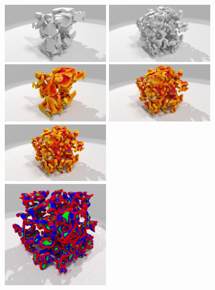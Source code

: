 \begin{figure}[ht]{
    \begin{center}
    \includegraphics[trim={17cm 0 13cm 0},clip,width=4.5cm]{images/digitalSnow/SnowE2_DigitalData}
    \includegraphics[trim={17cm 0 13cm 0},clip,width=4.5cm]{images/digitalSnow/SnowI08_DigitalData}\\
    \includegraphics[trim={17cm 0 13cm 0},clip,width=4.5cm]{images/digitalSnow/snowE2mean_0001}
    \includegraphics[trim={17cm 0 13cm 0},clip,width=4.5cm]{images/digitalSnow/snowI08mean_0001}
    \includegraphics[trim={17cm 0 13cm 0},clip,width=4.5cm]{images/digitalSnow/snowI08gaussian_0001}\\
    \includegraphics[width=4.5cm]{images/digitalSnow/Snow_I08_II_scale}

\end{center}}
\end{figure}
